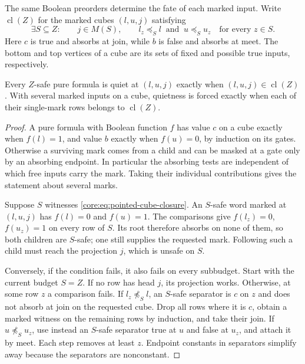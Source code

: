 The same Boolean preorders determine the fate of each marked input.
Write $\operatorname{cl}(Z)$ for the marked cubes $(l,u,j)$ satisfying
\begin{equation}\label{core:eq:pointed-cube-closure}
 \exists S\subseteq Z:\qquad j\in M(S),\qquad
 l_z\preceq_S l\ \text{ and }\ u\preceq_S u_z
 \quad\text{for every }z\in S .
\end{equation}
Here $c$ is true and absorbs at join, while $b$ is false and absorbs
at meet. The bottom and top vertices of a cube are its sets of fixed
and possible true inputs, respectively.

\begin{theorem}
\label{core:thm:partially-marked-cube-closure}
Every $Z$-safe pure formula is quiet at $(l,u,j)$ exactly when
$(l,u,j)\in\operatorname{cl}(Z)$. With several marked inputs on a
cube, quietness is forced exactly when each of their single-mark
rows belongs to $\operatorname{cl}(Z)$.
\end{theorem}
\begin{proof}
A pure formula with Boolean function $f$ has value $c$ on a cube
exactly when $f(l)=1$, and value $b$ exactly when $f(u)=0$,
by induction on its gates. Otherwise a surviving mark comes from a
child and can be masked at a gate only by an absorbing endpoint.
In particular the absorbing tests are independent of which free
inputs carry the mark. Taking their individual contributions gives
the statement about several marks.

Suppose $S$ witnesses \eqref{core:eq:pointed-cube-closure}. An
$S$-safe word marked at $(l,u,j)$ has $f(l)=0$ and $f(u)=1$.
The comparisons give $f(l_z)=0$, $f(u_z)=1$ on every row of $S$.
Its root therefore absorbs on none of them, so both children are
$S$-safe; one still supplies the requested mark. Following such
a child must reach the projection $j$, which is unsafe on $S$.

Conversely, if the condition fails, it also fails on every subbudget.
Start with the current budget $S=Z$. If no row has head $j$, its
projection works. Otherwise, at some row $z$ a comparison fails.
If $l_z\not\preceq_S l$, an $S$-safe separator is $c$ on $z$ and
does not absorb at join on the requested cube. Drop all rows where
it is $c$, obtain a marked witness on the remaining rows by
induction, and take their join. If $u\not\preceq_S u_z$, use instead
an $S$-safe separator true at $u$ and false at $u_z$, and attach it
by meet. Each step removes at least $z$. Endpoint constants in
separators simplify away because the separators are nonconstant.
\end{proof}

